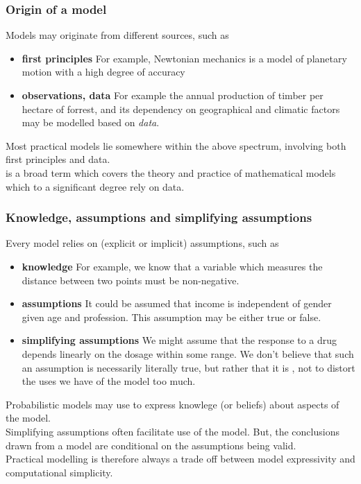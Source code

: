 \begin{frame}
\frametitle{Origin of a model}

Models may originate from different sources, such as
\begin{itemize}
\item {\bf first principles} For example, Newtonian mechanics is a model of planetary motion with a high degree of accuracy
\item {\bf observations, data} For example the annual production of timber per hectare of forrest, and its dependency on geographical and climatic factors may be modelled based on \emph{data}.
\end{itemize}

Most practical models lie somewhere within the  above spectrum, involving both first principles and data.\\[1ex]

 is a broad term which covers the theory and practice of mathematical models which to a significant degree rely on data.  
\end{frame}



\begin{frame}
\frametitle{Knowledge, assumptions and simplifying assumptions}

Every model relies on (explicit or implicit) assumptions, such as
\begin{itemize}
\item {\bf knowledge} For example, we know that a variable which measures the distance between two points must be non-negative.
\item {\bf assumptions} It could be assumed that income is independent of gender given age and profession. This assumption may be either true or false. 
\item {\bf simplifying assumptions} We might assume that the response to a drug depends linearly on the dosage within some range. We don't believe that such an assumption is necessarily literally true, but rather that it is , not to distort the uses we have of the model too much.
\end{itemize}

Probabilistic models may use  to express knowlege (or beliefs) about aspects of the model.\\[1ex] 

Simplifying assumptions often facilitate use of the model. But, the conclusions drawn from a model are conditional on the assumptions being valid.\\[1ex]

Practical modelling is therefore always a trade off between model expressivity  and computational simplicity.
\end{frame}


